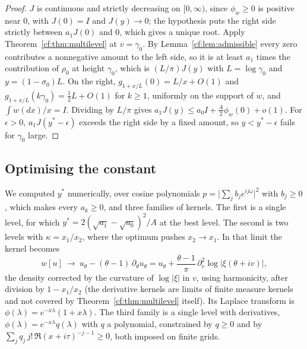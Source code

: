 \begin{proof}
$J$ is continuous and strictly decreasing on $[0,\infty)$, since $\phi_w\ge0$ is positive near $0$, with $J(0)=I$ and $J(y)\to0$; the hypothesis puts the right side strictly between $a_1J(0)$ and $0$, which gives a unique root. Apply Theorem~\ref{cf:thm:multilevel} at $v=\gamma_0$. By Lemma~\ref{cf:lem:admissible} every zero contributes a nonnegative amount to the left side, so it is at least $a_1$ times the contribution of $\rho_0$ at height $\gamma_0$, which is $(L/\pi)J(y)$ with $L=\log\gamma_0$ and $y=(1-\sigma_0)L$. On the right, $g_{1+x/L}(0)=L/x+O(1)$ and $g_{1+x/L}(k\gamma_0)=\frac12L+O(1)$ for $k\ge1$, uniformly on the support of $w$, and $\int w(dx)/x=I$. Dividing by $L/\pi$ gives $a_1J(y)\le a_0I+\frac A2\phi_w(0)+o(1)$. For $\epsilon>0$, $a_1J(y^\ast-\epsilon)$ exceeds the right side by a fixed amount, so $y<y^\ast-\epsilon$ fails for $\gamma_0$ large.
\end{proof}

\subsection{Optimising the constant}

We computed $y^\ast$ numerically, over cosine polynomials $p=\lvert\sum_jb_je^{ij\omega}\rvert^2$ with $b_j\ge0$, which makes every $a_k\ge0$, and three families of kernels. The first is a single level, for which $y^\ast=2(\sqrt{a_1}-\sqrt{a_0})^2/A$ at the best level. The second is two levels with $\kappa=x_1/x_2$, where the optimum pushes $x_2\to x_1$. In that limit the kernel becomes
\[
w[u]\ \longrightarrow\ u_\theta-(\theta-1)\,\partial_\theta u_\theta=u_\theta+\frac{\theta-1}\pi\,\partial_v^2\log\lvert\xi(\theta+iv)\rvert,
\]
the density corrected by the curvature of $\log\lvert\xi\rvert$ in $v$, using harmonicity, after division by $1-x_1/x_2$ (the derivative kernels are limits of finite measure kernels and not covered by Theorem~\ref{cf:thm:multilevel} itself). Its Laplace transform is $\phi(\lambda)=e^{-x\lambda}(1+x\lambda)$. The third family is a single level with derivatives, $\phi(\lambda)=e^{-x\lambda}q(\lambda)$ with $q$ a polynomial, constrained by $q\ge0$ and by $\sum_jq_j\,j!\,\Re(x+i\tau)^{-j-1}\ge0$, both imposed on finite grids.

